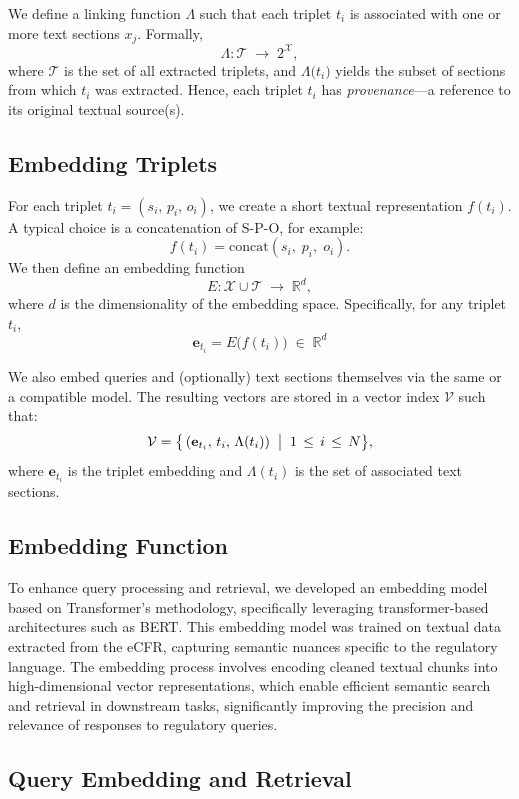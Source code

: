 \documentclass{article}
\begin{document}
We define a linking function $\Lambda$ such that each triplet \(t_i\) is associated with one or more text sections \(x_j\). Formally,
\[
\Lambda:
\mathcal{T}
\;\to\;
2^{\mathcal{X}},
\]
where $\mathcal{T}$ is the set of all extracted triplets, and $\Lambda\bigl(t_i\bigr)$ yields the subset of sections from which $t_i$ was extracted. Hence, each triplet $t_i$ has \emph{provenance}---a reference to its original textual source(s).
\subsection{Embedding Triplets}

For each triplet \( t_i = (s_i,\, p_i,\, o_i) \), we create a short textual representation \(f(t_i)\). A typical choice is a concatenation of S-P-O, for example:
\[
f(t_i) = \mathrm{concat}(s_i,\; p_i,\; o_i).
\]
We then define an embedding function
\[
E: \mathcal{X} \cup \mathcal{T} \;\to\; \mathbb{R}^{d},
\]
where \(d\) is the dimensionality of the embedding space. Specifically, for any triplet \(t_i\),
\[
\mathbf{e}_{t_i} = E\bigl(f(t_i)\bigr) \;\in\; \mathbb{R}^d
\]

We also embed queries and (optionally) text sections themselves via the same or a compatible model. The resulting vectors are stored in a vector index \(\mathcal{V}\) such that:
\[
\mathcal{V}
=
\bigl\{
\, (\mathbf{e}_{t_i},\, t_i,\, \Lambda(t_i))
\;\bigm|\; 1 \,\le\, i \,\le\, N
\bigr\},
\]
where \(\mathbf{e}_{t_i}\) is the triplet embedding and \(\Lambda(t_i)\) is the set of associated text sections.

\subsection{Embedding Function}
To enhance query processing and retrieval, we developed an embedding model based on Transformer's methodology, specifically leveraging transformer-based architectures such as BERT. This embedding model was trained on textual data extracted from the eCFR, capturing semantic nuances specific to the regulatory language. The embedding process involves encoding cleaned textual chunks into high-dimensional vector representations, which enable efficient semantic search and retrieval in downstream tasks, significantly improving the precision and relevance of responses to regulatory queries.

\subsection{Query Embedding and Retrieval}
\end{document}
